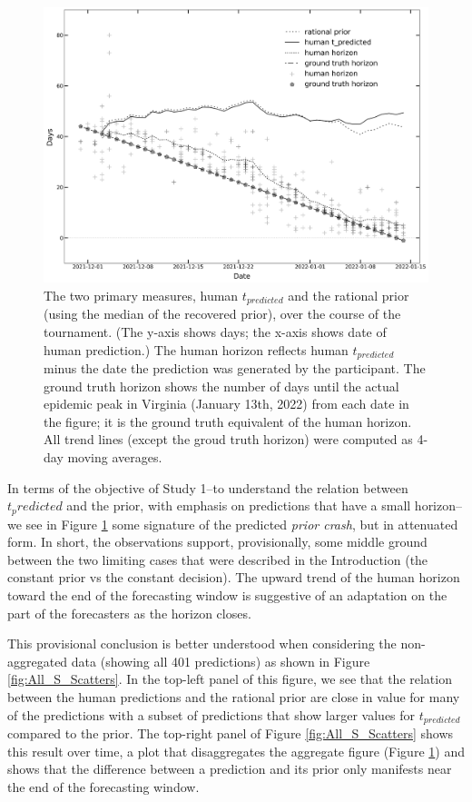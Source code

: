 \begin{figure}
    \centering
    \includegraphics[width=\linewidth]{Figures/Good_all_s.png}
    \caption{The two primary measures, human $t_{predicted}$ and the rational prior (using the median of the recovered prior), over the course of the tournament. (The y-axis shows days; the x-axis shows date of human prediction.)  The human horizon reflects human $t_{predicted}$ minus the date the prediction was generated by the participant.  The ground truth horizon shows the number of days until the actual epidemic peak in Virginia (January 13th, 2022) from each date in the figure; it is the ground truth equivalent of the human horizon.  All trend lines (except the groud truth horizon) were computed as 4-day moving averages. 
    }
    \label{fig:All_Ss_t_tot}
\end{figure}

In terms of the objective of Study 1--to understand the relation between $t_predicted$ and the prior, with emphasis on predictions that have a small horizon--we see in Figure \ref{fig:All_Ss_t_tot} some signature of the predicted \textit{prior crash}, but in attenuated form.  In short, the observations support, provisionally, some middle ground between the two limiting cases that were described in the Introduction (the constant prior vs the constant decision).  The upward trend of the human horizon toward the end of the forecasting window is suggestive of an adaptation on the part of the forecasters as the horizon closes.  

This provisional conclusion is better understood when considering the non-aggregated data (showing all 401 predictions) as shown in Figure \ref{fig:All_S_Scatters}.  In the top-left panel of this figure, we see that the relation between the human predictions and the rational prior are close in value for many of the predictions with a subset of predictions that show larger values for $t_{predicted}$ compared to the prior.  The top-right panel of Figure \ref{fig:All_S_Scatters} shows this result over time, a plot that disaggregates the aggregate figure (Figure \ref{fig:All_Ss_t_tot}) and shows that the difference between a prediction and its prior only manifests near the end of the forecasting window.

